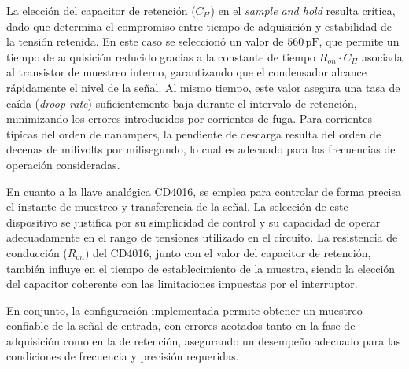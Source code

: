 La elección del capacitor de retención (\(C_H\)) en el \textit{sample and hold} resulta crítica, dado que
 determina el compromiso entre tiempo de adquisición y estabilidad de la tensión retenida. En este caso 
 se seleccionó un valor de \(560\,\text{pF}\), que permite un tiempo de adquisición reducido gracias a la
  constante de tiempo \(R_{on} \cdot C_H\) asociada al transistor de muestreo interno, garantizando que el
   condensador alcance rápidamente el nivel de la señal. Al mismo tiempo, este valor asegura una tasa de 
   caída (\textit{droop rate}) suficientemente baja durante el intervalo de retención, minimizando los 
   errores introducidos por corrientes de fuga. Para corrientes típicas del orden de nanampers, la 
   pendiente de descarga resulta del orden de decenas de milivolts por milisegundo, lo cual es adecuado
    para las frecuencias de operación consideradas.

En cuanto a la llave analógica CD4016, se emplea para controlar de forma precisa el instante de muestreo
 y transferencia de la señal. La selección de este dispositivo se justifica por su simplicidad de control
  y su capacidad de operar adecuadamente en el rango de tensiones utilizado en el circuito. La resistencia
   de conducción (\(R_{on}\)) del CD4016, junto con el valor del capacitor de retención, también influye 
   en el tiempo de establecimiento de la muestra, siendo la elección del capacitor coherente con las 
   limitaciones impuestas por el interruptor.

En conjunto, la configuración implementada permite obtener un muestreo confiable de la señal de entrada,
 con errores acotados tanto en la fase de adquisición como en la de retención, asegurando un desempeño 
 adecuado para las condiciones de frecuencia y precisión requeridas.



